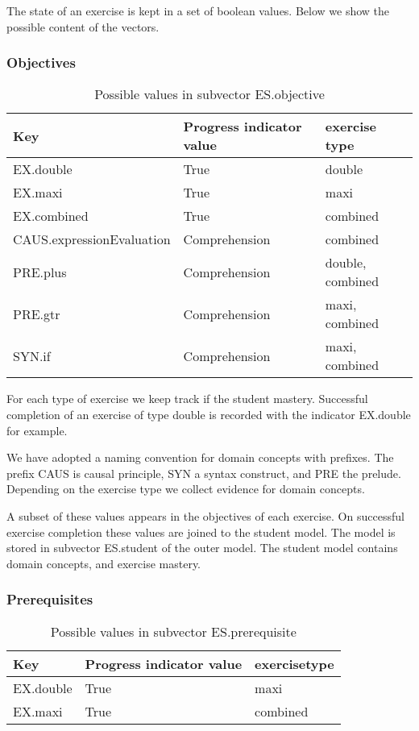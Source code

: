 The state of an exercise is kept in a set of boolean values.
Below we show the possible content of the vectors.


\subsubsection{Objectives}
\begin{table}[H]
\begin{tabular}{| l | l | l |}
\hline
Key & Progress indicator value& exercise type\\
\hline
EX.double& True & double\\
EX.maxi& True & maxi\\
EX.combined& True& combined\\
CAUS.expressionEvaluation& Comprehension& combined\\
PRE.plus& Comprehension& double, combined\\
PRE.gtr& Comprehension& maxi, combined\\
SYN.if & Comprehension& maxi, combined\\
\hline
\end{tabular}
\caption{Possible values in subvector ES.objective}
\label{double.obj}
\end{table}

For each type of exercise we keep track if the student mastery.
Successful completion of an exercise of type double is recorded with the indicator EX.double for example.

We have adopted a naming convention for domain concepts with prefixes.
The prefix CAUS is causal principle, SYN a syntax construct, and PRE the prelude.
Depending on the exercise type we collect evidence for domain concepts.

A subset of these values appears in the objectives of each exercise.
On successful exercise completion these values are joined to the student model.
The model is stored in subvector ES.student of the outer model.
The student model contains domain concepts, and exercise mastery.





\subsubsection{Prerequisites}
\begin{table}[H]
\begin{tabular}{| l | l | l |}
\hline
Key & Progress indicator value& exercisetype\\
\hline
EX.double& True& maxi\\
EX.maxi& True & combined\\
\hline
\end{tabular}
\caption{Possible values in subvector ES.prerequisite}
\label{double.obj}
\end{table}

